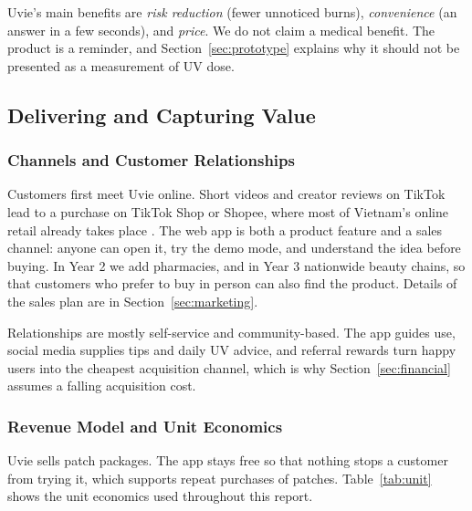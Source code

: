 Uvie's main benefits are \emph{risk reduction} (fewer unnoticed burns),
\emph{convenience} (an answer in a few seconds), and \emph{price}. We do not claim a
medical benefit. The product is a reminder, and Section~\ref{sec:prototype} explains
why it should not be presented as a measurement of UV dose.

\subsection{Delivering and Capturing Value}

\subsubsection{Channels and Customer Relationships}
Customers first meet Uvie online. Short videos and creator reviews on TikTok lead
to a purchase on TikTok Shop or Shopee, where most of Vietnam's online retail
already takes place \cite{krasia2026}. The web app is both a product feature and a
sales channel: anyone can open it, try the demo mode, and understand the idea before
buying. In Year 2 we add pharmacies, and in Year 3 nationwide beauty chains, so
that customers who prefer to buy in person can also find the product. Details of
the sales plan are in Section~\ref{sec:marketing}.

Relationships are mostly self-service and community-based. The app guides use,
social media supplies tips and daily UV advice, and referral rewards turn happy
users into the cheapest acquisition channel, which is why Section~\ref{sec:financial}
assumes a falling acquisition cost.

\subsubsection{Revenue Model and Unit Economics}
Uvie sells patch packages. The app stays free so that nothing stops a customer from
trying it, which supports repeat purchases of patches. Table~\ref{tab:unit} shows the
unit economics used throughout this report.

